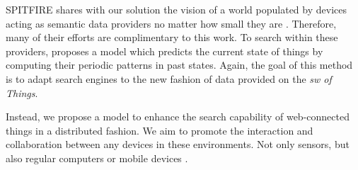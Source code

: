 SPITFIRE shares with our solution the vision of a world populated by devices acting as semantic data providers no matter how small they are \citep{hasemann_rdf_2012}.
Therefore, many of their efforts are complimentary to this work.
To search within these providers, \citet{pfisterer_spitfire:_2011} proposes a model which predicts the current state of things by computing their periodic patterns in past states.
Again, the goal of this method is to adapt search engines to the new fashion of data provided on the \emph{\acl{sw} of Things}.

Instead, we propose a model to enhance the search capability of web-connected things in a distributed fashion.
We aim to promote the interaction and collaboration between any devices in these environments.
Not only sensors, but also regular computers or mobile devices \citep{balandin_access_2011}.